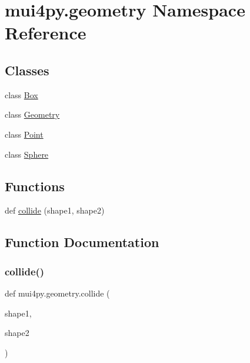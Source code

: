 \hypertarget{namespacemui4py_1_1geometry}{}\section{mui4py.\+geometry Namespace Reference}
\label{namespacemui4py_1_1geometry}
\subsection*{Classes}
\begin{DoxyCompactItemize}
\item 
class \hyperlink{classmui4py_1_1geometry_1_1_box}{Box}
\item 
class \hyperlink{classmui4py_1_1geometry_1_1_geometry}{Geometry}
\item 
class \hyperlink{classmui4py_1_1geometry_1_1_point}{Point}
\item 
class \hyperlink{classmui4py_1_1geometry_1_1_sphere}{Sphere}
\end{DoxyCompactItemize}
\subsection*{Functions}
\begin{DoxyCompactItemize}
\item 
def \hyperlink{namespacemui4py_1_1geometry_a46a0c25ce189288390d5e0354cae29cd}{collide} (shape1, shape2)
\end{DoxyCompactItemize}


\subsection{Function Documentation}
\mbox{\label{namespacemui4py_1_1geometry_a46a0c25ce189288390d5e0354cae29cd}} 
\subsubsection{\texorpdfstring{collide()}{collide()}}
{\footnotesize\ttfamily def mui4py.\+geometry.\+collide (\begin{DoxyParamCaption}\item[{}]{shape1,  }\item[{}]{shape2 }\end{DoxyParamCaption})}


